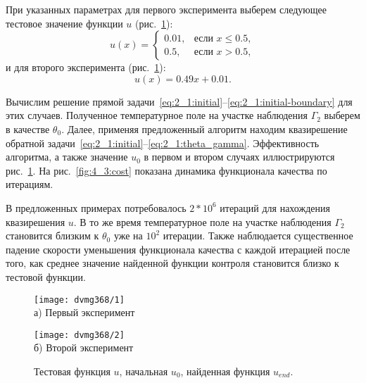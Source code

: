 При указанных параметрах для первого эксперимента выберем следующее тестовое
значение функции $u$ (рис.~\ref{fig:4_3:control}):
\begin{equation}
    \label{eq:4_3:equation}
    u(x)=
    \begin{cases}
        0.01, & \text{если } x \le 0.5, \\
        0.5, & \text{если } x > 0.5,
    \end{cases}
\end{equation}
и для второго эксперимента (рис.~\ref{fig:4_3:control}):
\begin{equation}
    \label{eq:4_3:test_function_1}
    u(x)=0.49x+0.01.
\end{equation}

Вычислим решение прямой
задачи~\eqref{eq:2_1:initial}--\eqref{eq:2_1:initial-boundary}
для этих случаев.
Полученное температурное поле на участке наблюдения
$\Gamma_2$ выберем в качестве $\theta_0$.
Далее, применяя предложенный алгоритм находим квазирешение обратной
задачи~\eqref{eq:2_1:initial}--\eqref{eq:2_1:theta_gamma}.
Эффективность алгоритма, а также значение $u_0$ в первом и
втором случаях иллюстрируются рис.~\ref{fig:4_3:control}.
На рис.~\ref{fig:4_3:cost} показана динамика функционала качества по итерациям.

\begin{remark}
    В предложенных примерах потребовалось
    $2*10^6$ итераций для нахождения квазирешения $u$.
    В то же время температурное поле на участке наблюдения
    $\Gamma_2$ становится близким к $\theta_0$ уже на $10^2$ итерации.
    Также наблюдается существенное падение скорости уменьшения функционала
    качества с каждой итерацией после того, как среднее значение найденной
    функции контроля становится близко к тестовой функции.
\end{remark}

\begin{figure}[ht]
    \begin{minipage}[b][][b]{0.49\linewidth}\centering
        \texttt{[image: dvmg368/1]} \\ а) Первый эксперимент
    \end{minipage}
    \hfill
    \begin{minipage}[b][][b]{0.49\linewidth}\centering
        \texttt{[image: dvmg368/2]} \\ б) Второй эксперимент
    \end{minipage}
    \caption{Тестовая функция $u$, начальная $u_0$, найденная функция $u_{end}.$}
    \label{fig:4_3:control}
\end{figure}


